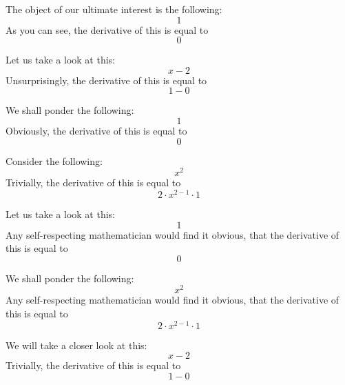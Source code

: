 \documentclass{article}
\begin{document}
The object of our ultimate interest is the following:
\begin{equation}
1 
\end{equation}
As you can see, the derivative of this is equal to
\begin{equation}
0 
\end{equation}

Let us take a look at this:
\begin{equation}
x - 2 
\end{equation}
Unsurprisingly, the derivative of this is equal to
\begin{equation}
1 - 0 
\end{equation}

We shall ponder the following:
\begin{equation}
1 
\end{equation}
Obviously, the derivative of this is equal to
\begin{equation}
0 
\end{equation}

Consider the following:
\begin{equation}
x ^{2 } 
\end{equation}
Trivially, the derivative of this is equal to
\begin{equation}
2 \cdot x ^{2 - 1 } \cdot 1 
\end{equation}

Let us take a look at this:
\begin{equation}
1 
\end{equation}
Any self-respecting mathematician would find it obvious, that the derivative of this is equal to
\begin{equation}
0 
\end{equation}

We shall ponder the following:
\begin{equation}
x ^{2 } 
\end{equation}
Any self-respecting mathematician would find it obvious, that the derivative of this is equal to
\begin{equation}
2 \cdot x ^{2 - 1 } \cdot 1 
\end{equation}

We will take a closer look at this:
\begin{equation}
x - 2 
\end{equation}
Trivially, the derivative of this is equal to
\begin{equation}
1 - 0 
\end{equation}
\end{document}
